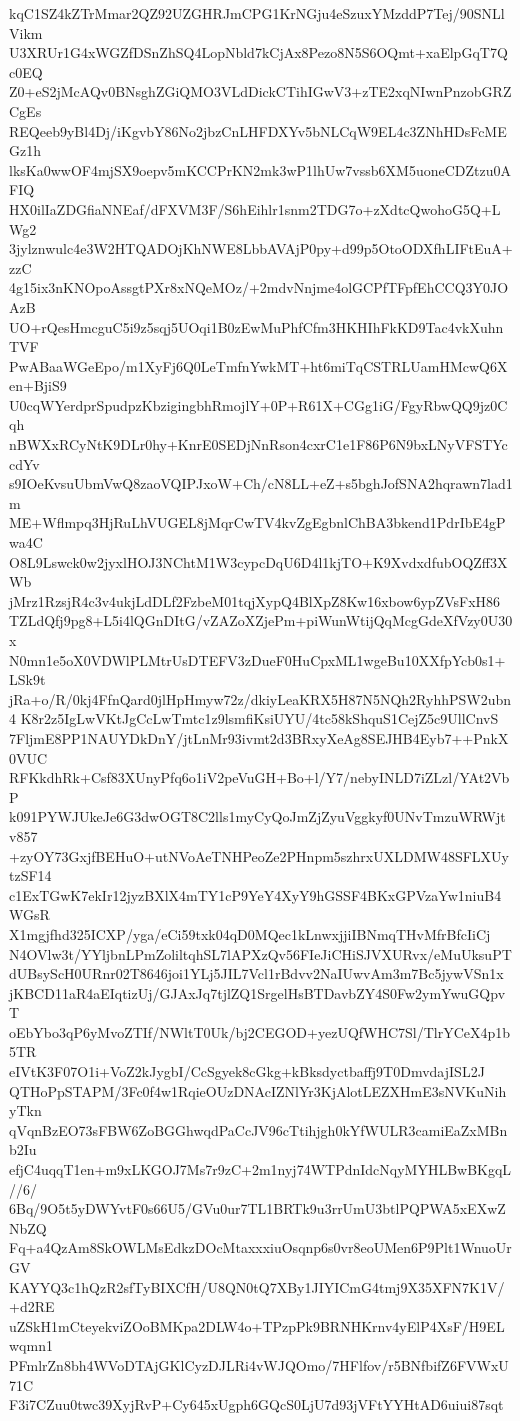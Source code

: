 kqC1SZ4kZTrMmar2QZ92UZGHRJmCPG1KrNGju4eSzuxYMzddP7Tej/90SNLlVikm
U3XRUr1G4xWGZfDSnZhSQ4LopNbld7kCjAx8Pezo8N5S6OQmt+xaElpGqT7Qc0EQ
Z0+eS2jMcAQv0BNsghZGiQMO3VLdDickCTihIGwV3+zTE2xqNIwnPnzobGRZCgEs
REQeeb9yBl4Dj/iKgvbY86No2jbzCnLHFDXYv5bNLCqW9EL4c3ZNhHDsFcMEGz1h
lksKa0wwOF4mjSX9oepv5mKCCPrKN2mk3wP1lhUw7vssb6XM5uoneCDZtzu0AFIQ
HX0ilIaZDGfiaNNEaf/dFXVM3F/S6hEihlr1snm2TDG7o+zXdtcQwohoG5Q+LWg2
3jylznwulc4e3W2HTQADOjKhNWE8LbbAVAjP0py+d99p5OtoODXfhLIFtEuA+zzC
4g15ix3nKNOpoAssgtPXr8xNQeMOz/+2mdvNnjme4olGCPfTFpfEhCCQ3Y0JOAzB
UO+rQesHmcguC5i9z5sqj5UOqi1B0zEwMuPhfCfm3HKHIhFkKD9Tac4vkXuhnTVF
PwABaaWGeEpo/m1XyFj6Q0LeTmfnYwkMT+ht6miTqCSTRLUamHMcwQ6Xen+BjiS9
U0cqWYerdprSpudpzKbzigingbhRmojlY+0P+R61X+CGg1iG/FgyRbwQQ9jz0Cqh
nBWXxRCyNtK9DLr0hy+KnrE0SEDjNnRson4cxrC1e1F86P6N9bxLNyVFSTYccdYv
s9IOeKvsuUbmVwQ8zaoVQIPJxoW+Ch/cN8LL+eZ+s5bghJofSNA2hqrawn7lad1m
ME+Wflmpq3HjRuLhVUGEL8jMqrCwTV4kvZgEgbnlChBA3bkend1PdrIbE4gPwa4C
O8L9Lswck0w2jyxlHOJ3NChtM1W3cypcDqU6D4l1kjTO+K9XvdxdfubOQZff3XWb
jMrz1RzsjR4c3v4ukjLdDLf2FzbeM01tqjXypQ4BlXpZ8Kw16xbow6ypZVsFxH86
TZLdQfj9pg8+L5i4lQGnDItG/vZAZoXZjePm+piWunWtijQqMcgGdeXfVzy0U30x
N0mn1e5oX0VDWlPLMtrUsDTEFV3zDueF0HuCpxML1wgeBu10XXfpYcb0s1+LSk9t
jRa+o/R/0kj4FfnQard0jlHpHmyw72z/dkiyLeaKRX5H87N5NQh2RyhhPSW2ubn4
K8r2z5IgLwVKtJgCcLwTmtc1z9lsmfiKsiUYU/4tc58kShquS1CejZ5c9UllCnvS
7FljmE8PP1NAUYDkDnY/jtLnMr93ivmt2d3BRxyXeAg8SEJHB4Eyb7++PnkX0VUC
RFKkdhRk+Csf83XUnyPfq6o1iV2peVuGH+Bo+l/Y7/nebyINLD7iZLzl/YAt2VbP
k091PYWJUkeJe6G3dwOGT8C2lls1myCyQoJmZjZyuVggkyf0UNvTmzuWRWjtv857
+zyOY73GxjfBEHuO+utNVoAeTNHPeoZe2PHnpm5szhrxUXLDMW48SFLXUytzSF14
c1ExTGwK7ekIr12jyzBXlX4mTY1cP9YeY4XyY9hGSSF4BKxGPVzaYw1niuB4WGsR
X1mgjfhd325ICXP/yga/eCi59txk04qD0MQec1kLnwxjjiIBNmqTHvMfrBfcIiCj
N4OVlw3t/YYljbnLPmZoliltqhSL7lAPXzQv56FIeJiCHiSJVXURvx/eMuUksuPT
dUBsyScH0URnr02T8646joi1YLj5JIL7Vcl1rBdvv2NaIUwvAm3m7Bc5jywVSn1x
jKBCD11aR4aEIqtizUj/GJAxJq7tjlZQ1SrgelHsBTDavbZY4S0Fw2ymYwuGQpvT
oEbYbo3qP6yMvoZTIf/NWltT0Uk/bj2CEGOD+yezUQfWHC7Sl/TlrYCeX4p1b5TR
eIVtK3F07O1i+VoZ2kJygbI/CcSgyek8cGkg+kBksdyctbaffj9T0DmvdajISL2J
QTHoPpSTAPM/3Fc0f4w1RqieOUzDNAcIZNlYr3KjAlotLEZXHmE3sNVKuNihyTkn
qVqnBzEO73sFBW6ZoBGGhwqdPaCcJV96cTtihjgh0kYfWULR3camiEaZxMBnb2Iu
efjC4uqqT1en+m9xLKGOJ7Ms7r9zC+2m1nyj74WTPdnIdcNqyMYHLBwBKgqL//6/
6Bq/9O5t5yDWYvtF0s66U5/GVu0ur7TL1BRTk9u3rrUmU3btlPQPWA5xEXwZNbZQ
Fq+a4QzAm8SkOWLMsEdkzDOcMtaxxxiuOsqnp6s0vr8eoUMen6P9Plt1WnuoUrGV
KAYYQ3c1hQzR2sfTyBIXCfH/U8QN0tQ7XBy1JIYICmG4tmj9X35XFN7K1V/+d2RE
uZSkH1mCteyekviZOoBMKpa2DLW4o+TPzpPk9BRNHKrnv4yElP4XsF/H9ELwqmn1
PFmlrZn8bh4WVoDTAjGKlCyzDJLRi4vWJQOmo/7HFlfov/r5BNfbifZ6FVWxU71C
F3i7CZuu0twc39XyjRvP+Cy645xUgph6GQcS0LjU7d93jVFtYYHtAD6uiui87sqt
